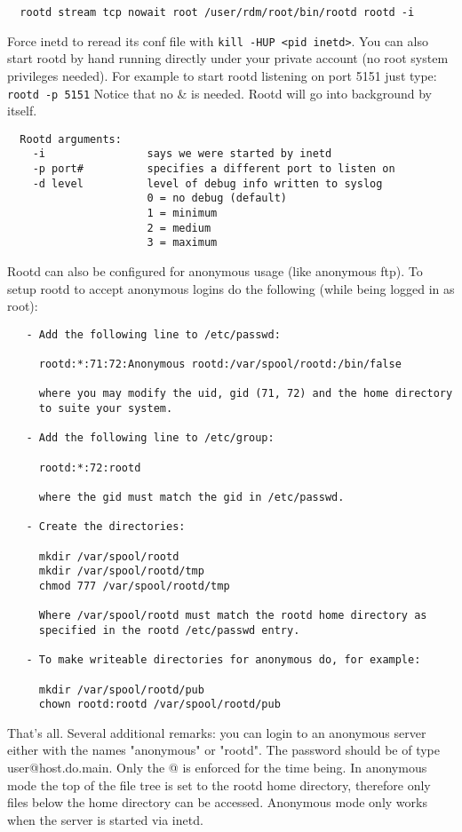 \documentclass[11pt]{book}
\begin{document}
\begin{verbatim}
  rootd stream tcp nowait root /user/rdm/root/bin/rootd rootd -i
\end{verbatim}
Force inetd to reread its conf file with \verb+kill -HUP <pid inetd>+.
You can also start rootd by hand running directly under your private
account (no root system privileges needed). For example to start
rootd listening on port 5151 just type:   \verb+rootd -p 5151+
Notice that no \& is needed. Rootd will go into background by itself.

\begin{verbatim}
  Rootd arguments:
    -i                says we were started by inetd
    -p port#          specifies a different port to listen on
    -d level          level of debug info written to syslog
                      0 = no debug (default)
                      1 = minimum
                      2 = medium
                      3 = maximum
\end{verbatim}
Rootd can also be configured for anonymous usage (like anonymous ftp).
To setup rootd to accept anonymous logins do the following (while being
logged in as root):

\begin{verbatim}
   - Add the following line to /etc/passwd:

     rootd:*:71:72:Anonymous rootd:/var/spool/rootd:/bin/false

     where you may modify the uid, gid (71, 72) and the home directory
     to suite your system.

   - Add the following line to /etc/group:

     rootd:*:72:rootd

     where the gid must match the gid in /etc/passwd.

   - Create the directories:

     mkdir /var/spool/rootd
     mkdir /var/spool/rootd/tmp
     chmod 777 /var/spool/rootd/tmp

     Where /var/spool/rootd must match the rootd home directory as
     specified in the rootd /etc/passwd entry.

   - To make writeable directories for anonymous do, for example:

     mkdir /var/spool/rootd/pub
     chown rootd:rootd /var/spool/rootd/pub
\end{verbatim}
That's all.  Several additional remarks:  you can login to an anonymous
server either with the names "anonymous" or "rootd".  The password should
be of type user@host.do.main. Only the @ is enforced for the time
being.  In anonymous mode the top of the file tree is set to the rootd
home directory, therefore only files below the home directory can be
accessed.  Anonymous mode only works when the server is started via
inetd.
\end{document}
